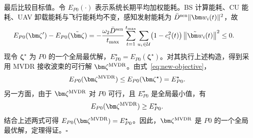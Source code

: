 最后比较目标值。令 $E_{P0}(\cdot)$ 表示系统长期平均加权能耗。BS 计算能耗、CU 能耗、UAV 卸载能耗与飞行能耗均不变，感知发射能耗为 $\bar D^{\rm sen}\|\bm w_i(t)\|^2$，故
\begin{align}\label{eq:new-objective}
E_{P0}(\bm\zeta')-E_{P0}(\tilde{\bm\zeta})
&=-\frac{\omega_2\bar D^{\rm sen}}{t_{\max}}\sum_{t=1}^{t_{\max}}\sum_{u_i\in\mathcal U}\bigl(1-c_i^2(t)\bigr)\left\|\tilde{\bm w}_i(t)\right\|^2\le0.
\end{align}
现令 $\bm\zeta^\star$ 为 $P0$ 的一个全局最优解，$E_{P0}^\star=E_{P0}(\bm\zeta^\star)$。对其执行上述构造，得到采用 MVDR 接收波束的可行解 $\bm\zeta^{\rm MVDR}$。由式~\eqref{eq:new-objective}，
\begin{equation}\label{eq:new-opt-upper}
E_{P0}(\bm\zeta^{\rm MVDR})\le E_{P0}(\bm\zeta^\star)=E_{P0}^\star.
\end{equation}
另一方面，由于 $\bm\zeta^{\rm MVDR}$ 对 $P0$ 可行，且 $E_{P0}^\star$ 是全局最小值，有
\begin{equation}\label{eq:new-opt-lower}
E_{P0}(\bm\zeta^{\rm MVDR})\ge E_{P0}^\star.
\end{equation}
结合上述两式可得 $E_{P0}(\bm\zeta^{\rm MVDR})=E_{P0}^\star$。因此，$\bm\zeta^{\rm MVDR}$ 是 $P0$ 的一个全局最优解，定理得证。\hfill$\square$


